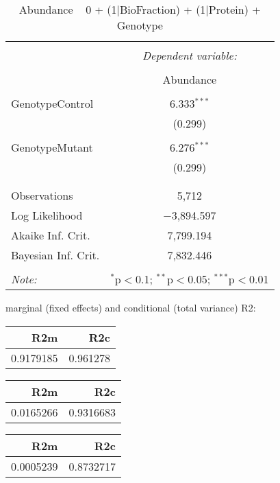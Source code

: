 \documentclass[11pt]{report}
\begin{document}
\begin{table}[!htbp] \centering 
  \caption{Abundance ~ 0 + (1|BioFraction) + (1|Protein) + Genotype} 
  \label{} 
\begin{tabular}{@{\extracolsep{5pt}}lc} 
\\[-1.8ex]\hline 
\hline \\[-1.8ex] 
 & \multicolumn{1}{c}{\textit{Dependent variable:}} \\ 
\cline{2-2} 
\\[-1.8ex] & Abundance \\ 
\hline \\[-1.8ex] 
 GenotypeControl & 6.333$^{***}$ \\ 
  & (0.299) \\ 
  & \\ 
 GenotypeMutant & 6.276$^{***}$ \\ 
  & (0.299) \\ 
  & \\ 
\hline \\[-1.8ex] 
Observations & 5,712 \\ 
Log Likelihood & $-$3,894.597 \\ 
Akaike Inf. Crit. & 7,799.194 \\ 
Bayesian Inf. Crit. & 7,832.446 \\ 
\hline 
\hline \\[-1.8ex] 
\textit{Note:}  & \multicolumn{1}{r}{$^{*}$p$<$0.1; $^{**}$p$<$0.05; $^{***}$p$<$0.01} \\ 
\end{tabular} 
\end{table} 
marginal (fixed effects) and conditional (total variance) R2:

\begin{tabular}{r|r}
\hline
R2m & R2c\\
\hline
0.9179185 & 0.961278\\
\hline
\end{tabular}

\begin{tabular}{r|r}
\hline
R2m & R2c\\
\hline
0.0165266 & 0.9316683\\
\hline
\end{tabular}

\begin{tabular}{r|r}
\hline
R2m & R2c\\
\hline
0.0005239 & 0.8732717\\
\hline
\end{tabular}
\end{document}
